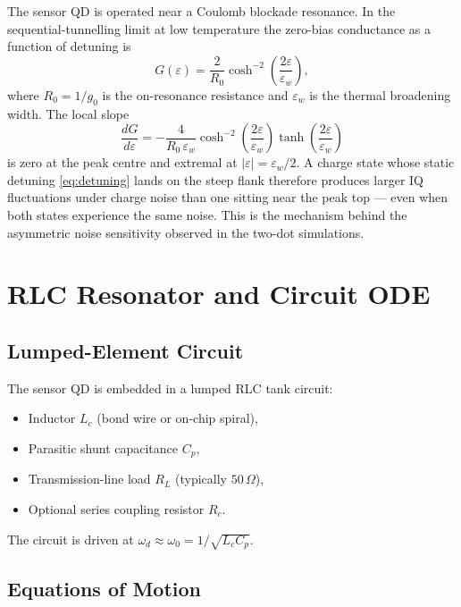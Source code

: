 \documentclass[11pt,a4paper]{article}
\begin{document}
The sensor QD is operated near a Coulomb blockade resonance.
In the sequential-tunnelling limit at low temperature the zero-bias
conductance as a function of detuning is \cite{Beenakker1991}
\begin{equation}
  G(\varepsilon) = \frac{2}{R_0}
    \cosh^{-2}\!\!\left(\frac{2\varepsilon}{\varepsilon_w}\right),
  \label{eq:coulomb_peak}
\end{equation}
where $R_0=1/g_0$ is the on-resonance resistance and $\varepsilon_w$ is the
thermal broadening width.
The local slope
\begin{equation}
  \frac{dG}{d\varepsilon}
  = -\frac{4}{R_0\,\varepsilon_w}
    \cosh^{-2}\!\!\left(\frac{2\varepsilon}{\varepsilon_w}\right)
    \tanh\!\left(\frac{2\varepsilon}{\varepsilon_w}\right)
  \label{eq:dGdeps}
\end{equation}
is zero at the peak centre and extremal at $|\varepsilon|=\varepsilon_w/2$.
A charge state whose static detuning \eqref{eq:detuning} lands on the steep
flank therefore produces larger IQ fluctuations under charge noise than one
sitting near the peak top --- even when both states experience the same noise.
This is the mechanism behind the asymmetric noise sensitivity observed in the
two-dot simulations.

\section{RLC Resonator and Circuit ODE}

\subsection{Lumped-Element Circuit}

The sensor QD is embedded in a lumped RLC tank circuit:
\begin{itemize}[nosep]
  \item Inductor $L_c$ (bond wire or on-chip spiral),
  \item Parasitic shunt capacitance $C_p$,
  \item Transmission-line load $R_L$ (typically $50\,\Omega$),
  \item Optional series coupling resistor $R_c$.
\end{itemize}
The circuit is driven at $\omega_d\approx\omega_0=1/\sqrt{L_cC_p}$.

\subsection{Equations of Motion}
\end{document}
